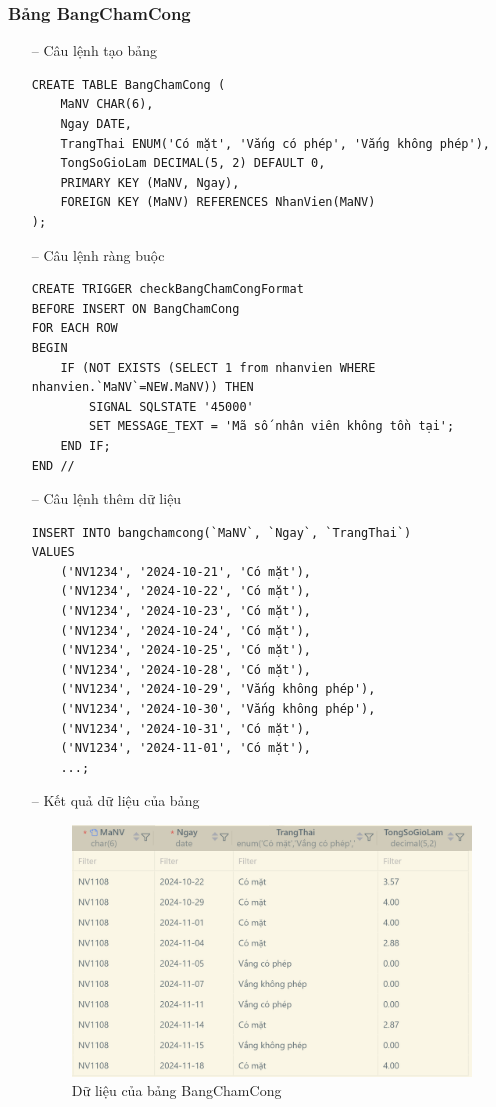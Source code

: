 \subsubsection{Bảng BangChamCong}
\begin{itemize}
    \item [--] Câu lệnh tạo bảng
   \begin{verbatim}
CREATE TABLE BangChamCong (
    MaNV CHAR(6),
    Ngay DATE,
    TrangThai ENUM('Có mặt', 'Vắng có phép', 'Vắng không phép'),
    TongSoGioLam DECIMAL(5, 2) DEFAULT 0,
    PRIMARY KEY (MaNV, Ngay),
    FOREIGN KEY (MaNV) REFERENCES NhanVien(MaNV)
);
    \end{verbatim}
    \item [--] Câu lệnh ràng buộc
   \begin{verbatim}
CREATE TRIGGER checkBangChamCongFormat 
BEFORE INSERT ON BangChamCong
FOR EACH ROW
BEGIN
    IF (NOT EXISTS (SELECT 1 from nhanvien WHERE nhanvien.`MaNV`=NEW.MaNV)) THEN
        SIGNAL SQLSTATE '45000'
        SET MESSAGE_TEXT = 'Mã số nhân viên không tồn tại';
    END IF;
END //
    \end{verbatim}
    \newpage
    \item [--] Câu lệnh thêm dữ liệu
   \begin{verbatim}
INSERT INTO bangchamcong(`MaNV`, `Ngay`, `TrangThai`)
VALUES
    ('NV1234', '2024-10-21', 'Có mặt'),
    ('NV1234', '2024-10-22', 'Có mặt'),
    ('NV1234', '2024-10-23', 'Có mặt'),
    ('NV1234', '2024-10-24', 'Có mặt'),
    ('NV1234', '2024-10-25', 'Có mặt'),
    ('NV1234', '2024-10-28', 'Có mặt'),
    ('NV1234', '2024-10-29', 'Vắng không phép'),
    ('NV1234', '2024-10-30', 'Vắng không phép'),
    ('NV1234', '2024-10-31', 'Có mặt'),
    ('NV1234', '2024-11-01', 'Có mặt'),
    ...;
    \end{verbatim}
    \item [--] Kết quả dữ liệu của bảng
    \begin{figure}[H]
        \centering
        \includegraphics[width=\linewidth]{content/images/data_bangchamcong.png}
        \caption{Dữ liệu của bảng BangChamCong}
        \label{fig:data_bangchamcong}
    \end{figure}
\end{itemize}
\newpage
